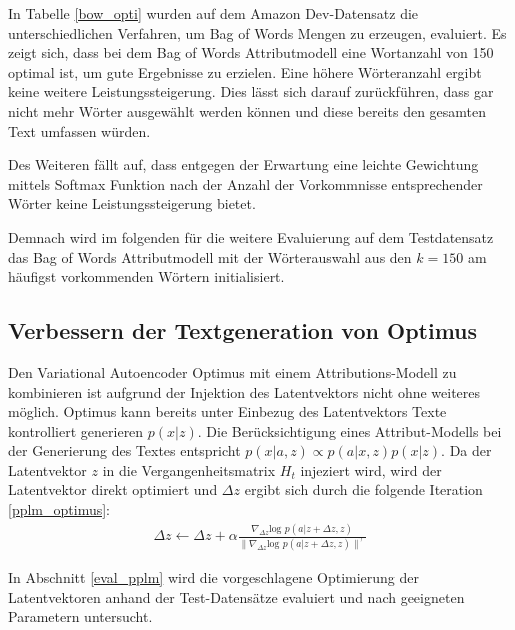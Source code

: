 In Tabelle \ref{bow_opti} wurden auf dem Amazon Dev-Datensatz die unterschiedlichen Verfahren, um Bag of Words Mengen zu erzeugen, evaluiert.
Es zeigt sich, dass bei dem Bag of Words Attributmodell eine Wortanzahl von 150 optimal ist, um gute Ergebnisse zu erzielen. 
Eine höhere Wörteranzahl ergibt keine weitere Leistungssteigerung. Dies lässt sich darauf zurückführen, dass gar nicht mehr Wörter ausgewählt werden können und diese bereits den gesamten Text umfassen würden.

Des Weiteren fällt auf, dass entgegen der Erwartung eine leichte Gewichtung mittels Softmax Funktion nach der Anzahl der Vorkommnisse entsprechender Wörter keine Leistungssteigerung bietet.

Demnach wird im folgenden für die weitere Evaluierung auf dem Testdatensatz das Bag of Words Attributmodell mit der Wörterauswahl aus den $k=150$ am häufigst vorkommenden Wörtern initialisiert.

\subsection{Verbessern der Textgeneration von Optimus}
Den Variational Autoencoder Optimus mit einem Attributions-Modell zu kombinieren ist aufgrund der Injektion des Latentvektors nicht ohne weiteres möglich.
Optimus kann bereits unter Einbezug des Latentvektors Texte kontrolliert generieren $p(x|z)$.
Die Berücksichtigung eines Attribut-Modells bei der Generierung des Textes entspricht $p(x|a,z) \propto p(a|x,z)p(x|z)$. %
Da der Latentvektor $z$ in die Vergangenheitsmatrix $H_t$ injeziert wird, wird der Latentvektor direkt optimiert und $\Delta z$ ergibt sich durch die folgende Iteration \ref{pplm_optimus}:
\begin{align}
    \label{pplm_optimus}
    \Delta z \leftarrow \Delta z + \alpha \frac{\nabla_{\Delta z} \text{log }p(a|z+\Delta z,z)}{\| \nabla_{\Delta z} \text{log }p(a|z+\Delta z,z)\|^\gamma}
\end{align}

In Abschnitt \ref*{eval_pplm} wird die vorgeschlagene Optimierung der Latentvektoren anhand der Test-Datensätze evaluiert und nach geeigneten Parametern untersucht.


